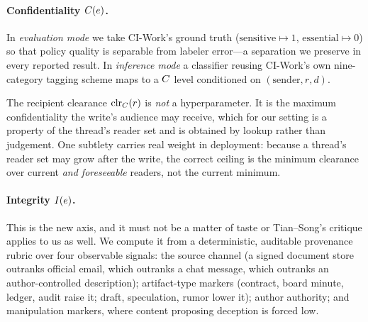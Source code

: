\paragraph{Confidentiality $C(e)$.} In \emph{evaluation mode} we take
CI-Work's ground truth ($\text{sensitive}\mapsto 1$,
$\text{essential}\mapsto 0$) so that policy quality is separable from labeler
error---a separation we preserve in every reported result. In \emph{inference
mode} a classifier reusing CI-Work's own nine-category tagging scheme maps to a
$C$ level conditioned on $(\text{sender}, r, d)$.

The recipient clearance $\mathrm{clr}_C(r)$ is \emph{not} a hyperparameter. It is the
maximum confidentiality the write's audience may receive, which for our setting
is a property of the thread's reader set and is obtained by lookup rather than
judgement. One subtlety carries real weight in deployment: because a thread's
reader set may grow after the write, the correct ceiling is the minimum
clearance over current \emph{and foreseeable} readers, not the current
minimum.

\paragraph{Integrity $I(e)$.} This is the new axis, and it must not be a
matter of taste or Tian--Song's critique applies to us as well. We compute it
from a deterministic, auditable provenance rubric over four observable signals:
the source channel (a signed document store outranks official email, which
outranks a chat message, which outranks an author-controlled description);
artifact-type markers (contract, board minute, ledger, audit raise it;
draft, speculation, rumor lower it); author authority; and manipulation
markers, where content proposing deception is forced low.

